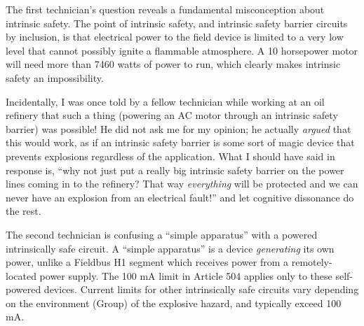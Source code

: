 
The first technician's question reveals a fundamental misconception about intrinsic safety.  The point of intrinsic safety, and intrinsic safety barrier circuits by inclusion, is that electrical power to the field device is limited to a very low level that cannot possibly ignite a flammable atmosphere.  A 10 horsepower motor will need more than 7460 watts of power to run, which clearly makes intrinsic safety an impossibility.

Incidentally, I was once told by a fellow technician while working at an oil refinery that such a thing (powering an AC motor through an intrinsic safety barrier) was possible!  He did not ask me for my opinion; he actually {\it argued} that this would work, as if an intrinsic safety barrier is some sort of magic device that prevents explosions regardless of the application.  What I should have said in response is, ``why not just put a really big intrinsic safety barrier on the power lines coming in to the refinery?  That way {\it everything} will be protected and we can never have an explosion from an electrical fault!'' and let cognitive dissonance do the rest.

\vskip 10pt

The second technician is confusing a ``simple apparatus'' with a powered intrinsically safe circuit.  A ``simple apparatus'' is a device {\it generating} its own power, unlike a Fieldbus H1 segment which receives power from a remotely-located power supply.  The 100 mA limit in Article 504 applies only to these self-powered devices.  Current limits for other intrinsically safe circuits vary depending on the environment (Group) of the explosive hazard, and typically exceed 100 mA.




